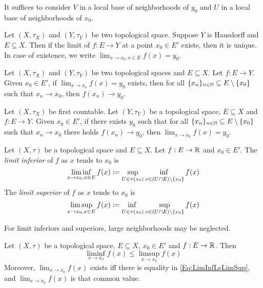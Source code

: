 \documentclass[screen]{techreport}
\numberwithin{equation}{section}
\begin{document}
\begin{remark}\label{Rem:LimitsConsiderLocalbase}
	It suffices to consider $V$ in a local base of neighborhoods of $y_0$ and $U$ in a local base of neighborhoods of $x_0$.
\end{remark}

\begin{proposition}\label{Prop:LimitIntoT2AtMostOne}
	Let $(X,\tau_X)$ and $(Y,\tau_Y)$ be two topological space.
	Suppose $Y$ is Hausdorff and $E \subseteq X$.
	Then if the limit of $f : E \to Y$ at a point $x_0 \in E'$ exists, then it is unique.
	In case of existence, we write $\lim_{x \to x_0, x \in E} f(x) = y_0$.
\end{proposition}

\begin{proposition}\label{Prop:LimitImlySeqConv}
	Let $(X,\tau_X)$ and $(Y,\tau_Y)$ be two topological spaces and $E \subseteq X$.
	Let $f : E \to Y$.
	Given $x_0 \in E'$, if $\lim_{x \to x_0} f(x) = y_0$ exists, then for all $\{x_n\}_{n \in \mathbb{N}} \subseteq E \setminus \{x_0\}$ such that $x_n \rightarrow x_0$, then $f(x_n) \rightarrow y_0$.
\end{proposition}

\begin{proposition}\label{Prop:LimitFromFstCountExistIfSeqConv}
	Let $(X,\tau_X)$ be first countable.
	Let $(Y,\tau_Y)$ be a topological space, $E \subseteq X$ and $f: E \to Y$.
	Given $x_0 \in E'$, if there exists $y_0$ such that for all $\{x_n\}_{n \in \mathbb{N}} \subseteq E \setminus \{x_0\}$ such that $x_n \rightarrow x_0$ there holds $f(x_n) \rightarrow y_0$, then $\lim_{x \to x_0} f(x) = y_0$.
\end{proposition}

\begin{definition}\label{De:LimitInfAndSup}
	Let $(X,\tau)$ be a topological space and $E \subseteq X$.
	Let $f : E \to \mathbb{R}$ and $x_0 \in E'$.
	The \emph{limit inferior} of $f$ as $x$ tends to $x_0$ is
	\[
 	\liminf_{x \to x_0, x \in E} f(x) \coloneqq \adjustlimits \sup_{U \in \tau(x_0)} \inf_{x \in (U \cap E) \setminus \{x_0\}} f(x)
	\]
	The \emph{limit superior} of $f$ as $x$ tends to $x_0$ is
	\[
	\limsup_{x \to x_0, x \in E} f(x) \coloneqq \adjustlimits \inf_{U \in \tau(x_0)} \sup_{x \in (U \cap E) \setminus \{x_0\}} f(x)
	\]
\end{definition}

\begin{remark}\label{Rem:LimitInfAndSupNeglectLargeNeigh}
	For limit inferiors and superiors, large neighborhoods may be neglected.
\end{remark}

\begin{theorem}\label{The:LimInfLeLimSup}
	Let $(X,\tau)$ be a topological space, $E \subseteq X$, $x_0 \in E'$ and $f : E \to \mathbb{R}$.
	Then
	\begin{equation}
		\liminf_{x \to x_0} f(x) \le \limsup_{x \to x_0} f(x) \label{Eq:LimInfLeLimSup}
	\end{equation}
	Moreover, $\lim_{x \to x_0} f(x)$ exists iff there is equality in \eqref{Eq:LimInfLeLimSup}, and $\lim_{x \to x_0} f(x)$ is that common value.
\end{theorem}



\end{document}
